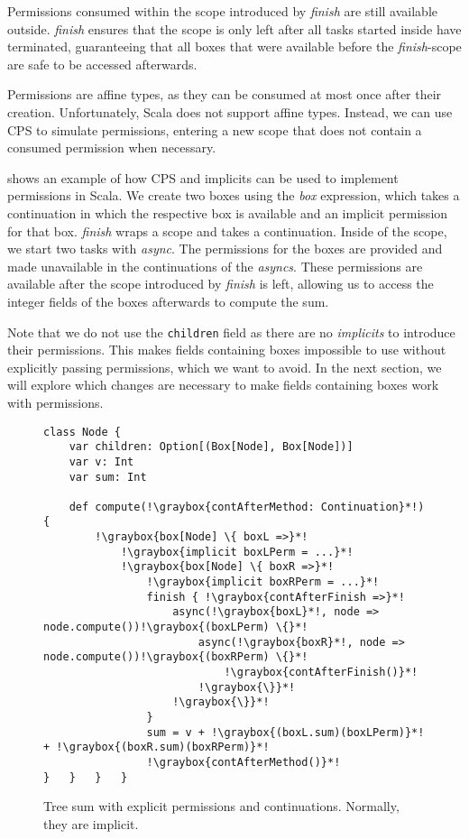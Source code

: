 Permissions consumed within the scope introduced by \textit{finish} are still available outside. \textit{finish} ensures that the scope is only left after all tasks started inside have terminated, guaranteeing that all boxes that were available before the \textit{finish}-scope are safe to be accessed afterwards.

Permissions are affine types, as they can be consumed at most once after their creation. Unfortunately, Scala does not support affine types. Instead, we can use CPS to simulate permissions, entering a new scope that does not contain a consumed permission when necessary.

 shows an example of how CPS and implicits can be used to implement permissions in Scala. We create two boxes using the \textit{box} expression, which takes a continuation in which the respective box is available and an implicit permission for that box. \textit{finish} wraps a scope and takes a continuation. Inside of the scope, we start two tasks with \textit{async}. The permissions for the boxes are provided and made unavailable in the continuations of the \textit{asyncs}. These permissions are available after the scope introduced by \textit{finish} is left, allowing us to access the integer fields of the boxes afterwards to compute the sum.

Note that we do not use the \lstinline{children} field as there are no \textit{implicits} to introduce their permissions. This makes fields containing boxes impossible to use without explicitly passing permissions, which we want to avoid. In the next section, we will explore which changes are necessary to make fields containing boxes work with permissions.

\begin{figure}
\centering
\begin{lstlisting}
class Node {
	var children: Option[(Box[Node], Box[Node])]
	var v: Int
	var sum: Int

	def compute(!\graybox{contAfterMethod: Continuation}*!) {
		!\graybox{box[Node] \{ boxL =>}*!
			!\graybox{implicit boxLPerm = ...}*!
			!\graybox{box[Node] \{ boxR =>}*!
				!\graybox{implicit boxRPerm = ...}*!
				finish { !\graybox{contAfterFinish =>}*!
					async(!\graybox{boxL}*!, node => node.compute())!\graybox{(boxLPerm) \{}*!
     					async(!\graybox{boxR}*!, node => node.compute())!\graybox{(boxRPerm) \{}*!
							!\graybox{contAfterFinish()}*!
						!\graybox{\}}*!
					!\graybox{\}}*!
				}
				sum = v + !\graybox{(boxL.sum)(boxLPerm)}*! + !\graybox{(boxR.sum)(boxRPerm)}*!
				!\graybox{contAfterMethod()}*!
}	}	}	}
\end{lstlisting}
    \caption{Tree sum with explicit permissions and continuations. Normally, they are implicit.}
    \label{fig:sum-permissions}
\end{figure}

